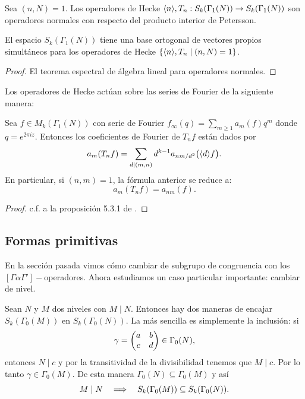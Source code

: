 \begin{prop}
  Sea $(n,N)=1$. Los operadores de Hecke $\langle n \rangle,T_n:S_k(\Gamma_1(N))\rightarrow S_k(\Gamma_1(N))$ son
  operadores normales con respecto del producto interior de Petersson.
\end{prop}
\begin{cor}\label{cor:basesimultanea}
  El espacio $S_k(\Gamma_1(N))$ tiene una base ortogonal de vectores propios simult\'aneos para
  los operadores de Hecke $\{\langle n \rangle,T_n\mid (n,N)=1\}$.
\end{cor}
\begin{proof}
  El teorema espectral de \'algebra lineal para operadores normales.
\end{proof}

Los operadores de Hecke act\'uan sobre las series de Fourier de la siguiente manera:

\begin{prop}\label{prop:coefTnf}
  Sea $f\in M_k(\Gamma_1(N))$ con serie de Fourier $f_{\infty}(q)=\sum_{m\geq1}a_m(f)q^m$ donde
  $q=e^{2\pi i z}$. Entonces los coeficientes de Fourier de $T_nf$ est\'an dados por
  \[
    a_m(T_nf)=\sum_{d\mid(m,n)}d^{k-1}a_{nm/d^2}\big(\langle d \rangle f\big).
  \]
  En particular, si $(n,m)=1$, la f\'ormula anterior se reduce a:
  \[
    a_m(T_nf)=a_{nm}(f).
  \]
\end{prop}
\begin{proof}
  c.f. a la proposici\'on 5.3.1 de \cite{DiamondShurmanAFCIMF}.
\end{proof}


\subsection{Formas primitivas}\label{sec:formas_primitivas}%

En la secci\'on pasada vimos c\'omo cambiar de subgrupo de congruencia con los
$[\Gamma\alpha\Gamma']-$operadores. Ahora estudiamos un caso particular importante: cambiar de
nivel.

Sean $N$ y $M$ dos niveles con $M\mid N$. Entonces hay dos maneras de encajar $S_k(\Gamma_0(M))$
en $S_k(\Gamma_0(N))$. La m\'as sencilla es simplemente la inclusi\'on: si
\[
  \gamma=\begin{pmatrix}a & b\\ c & d\end{pmatrix}\in\Gamma_0(N),
\]
entonces $N\mid c$ y por la transitividad de la divisibilidad tenemos que  $M\mid c$. Por lo tanto
$\gamma\in\Gamma_0(M)$. De esta manera $\Gamma_0(N)\subseteq\Gamma_0(M)$ y as\'i
\[
  M\mid N\quad\Longrightarrow\quad S_k(\Gamma_0(M))\subseteq S_k(\Gamma_0(N)).
\]

